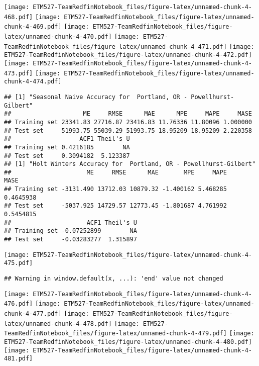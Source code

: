 \documentclass[]{article}
\begin{document}
\texttt{[image: ETM527-TeamRedfinNotebook\_files/figure-latex/unnamed-chunk-4-468.pdf]}
\texttt{[image: ETM527-TeamRedfinNotebook\_files/figure-latex/unnamed-chunk-4-469.pdf]}
\texttt{[image: ETM527-TeamRedfinNotebook\_files/figure-latex/unnamed-chunk-4-470.pdf]}
\texttt{[image: ETM527-TeamRedfinNotebook\_files/figure-latex/unnamed-chunk-4-471.pdf]}
\texttt{[image: ETM527-TeamRedfinNotebook\_files/figure-latex/unnamed-chunk-4-472.pdf]}
\texttt{[image: ETM527-TeamRedfinNotebook\_files/figure-latex/unnamed-chunk-4-473.pdf]}
\texttt{[image: ETM527-TeamRedfinNotebook\_files/figure-latex/unnamed-chunk-4-474.pdf]}

\begin{verbatim}
## [1] "Seasonal Naive Accuracy for  Portland, OR - Powellhurst-Gilbert"
##                    ME     RMSE      MAE      MPE     MAPE     MASE
## Training set 23341.83 27716.87 23416.83 11.76336 11.80096 1.000000
## Test set     51993.75 55039.29 51993.75 18.95209 18.95209 2.220358
##                   ACF1 Theil's U
## Training set 0.4216185        NA
## Test set     0.3094182  5.123387
## [1] "Holt Winters Accuracy for  Portland, OR - Powellhurst-Gilbert"
##                     ME     RMSE      MAE       MPE     MAPE      MASE
## Training set -3131.490 13712.03 10879.32 -1.400162 5.468285 0.4645938
## Test set     -5037.925 14729.57 12773.45 -1.801687 4.761992 0.5454815
##                     ACF1 Theil's U
## Training set -0.07252899        NA
## Test set     -0.03283277  1.315897
\end{verbatim}

\texttt{[image: ETM527-TeamRedfinNotebook\_files/figure-latex/unnamed-chunk-4-475.pdf]}

\begin{verbatim}
## Warning in window.default(x, ...): 'end' value not changed
\end{verbatim}

\texttt{[image: ETM527-TeamRedfinNotebook\_files/figure-latex/unnamed-chunk-4-476.pdf]}
\texttt{[image: ETM527-TeamRedfinNotebook\_files/figure-latex/unnamed-chunk-4-477.pdf]}
\texttt{[image: ETM527-TeamRedfinNotebook\_files/figure-latex/unnamed-chunk-4-478.pdf]}
\texttt{[image: ETM527-TeamRedfinNotebook\_files/figure-latex/unnamed-chunk-4-479.pdf]}
\texttt{[image: ETM527-TeamRedfinNotebook\_files/figure-latex/unnamed-chunk-4-480.pdf]}
\texttt{[image: ETM527-TeamRedfinNotebook\_files/figure-latex/unnamed-chunk-4-481.pdf]}
\end{document}
